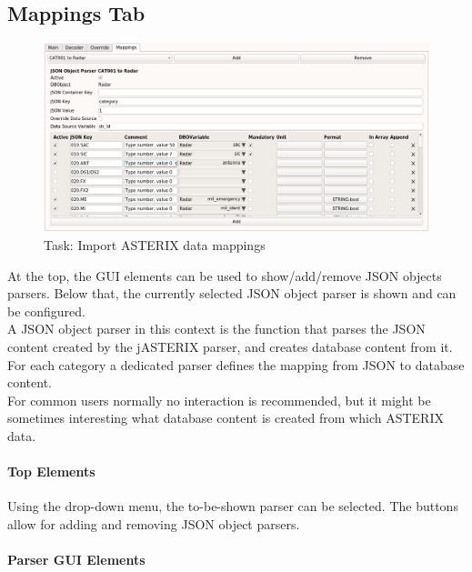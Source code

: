 \subsection{Mappings Tab}

\begin{figure}[H]
  \hspace*{-2.5cm}
    \includegraphics[width=19cm,frame]{../screenshots/asterix_import_data_mappings.png}
  \caption{Task: Import ASTERIX data mappings}
\end{figure}

At the top, the GUI elements can be used to show/add/remove JSON objects parsers. Below that, the currently selected JSON object parser is shown and can be configured. \\

A JSON object parser in this context is the function that parses the JSON content created by the jASTERIX parser, and creates database content from it. For each category a dedicated parser defines the mapping from JSON to database content. \\

For common users normally no interaction is recommended, but it might be sometimes interesting what database content is created from which ASTERIX data.

\paragraph{Top Elements}

Using the drop-down menu, the to-be-shown parser can be selected. The buttons allow for adding and removing JSON object parsers.

\paragraph{Parser GUI Elements}

